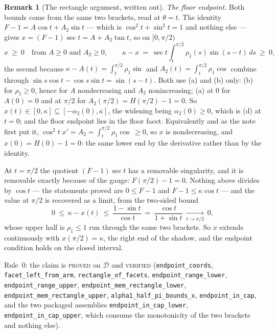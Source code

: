 \documentclass[11pt]{article}
\theoremstyle{definition}
\newtheorem{remark}[theorem]{Remark}
\begin{document}
\begin{remark}[The rectangle argument, written out]
\emph{The floor endpoint.} Both bounds come from the same two brackets, read at
$\theta=t$. The identity $F-1=A\cos t+A_2\sin t$ --- which is
$\cos^2t+\sin^2t=1$ and nothing else --- gives $x=(F-1)\sec t=A+A_2\tan t$, so on
$[0,\pi/2)$
\[
  x\ \ge\ 0\quad\text{from } A\ge0 \text{ and } A_2\ge0,\qquad
  \kappa-x\ =\ \sec t\int_t^{\pi/2}\!\rho_1(s)\sin(s-t)\,ds\ \ge\ 0 ,
\]
the second because $\kappa-A(t)=\int_t^{\pi/2}\rho_1\sin$ and $A_2(t)=\int_t^{\pi/2}\rho_1\cos$
combine through $\sin s\cos t-\cos s\sin t=\sin(s-t)$. Both use (a) and (b) only: (b) for
$\rho_1\ge0$, hence for $A$ nondecreasing and $A_2$ nonincreasing; (a) at $0$ for $A(0)=0$ and
at $\pi/2$ for $A_2(\pi/2)=H(\pi/2)-1=0$. So $x(t)\in[0,\kappa]\subseteq[-\alpha_2(0),\kappa]$,
the widening being $\alpha_2(0)\ge0$, which is (d) at $t=0$; and the floor endpoint lies in
the floor facet. Equivalently and as the note first put it,
$\cos^2t\;x'=A_2=\int_t^{\pi/2}\rho_1\cos\ \ge0$, so $x$ is nondecreasing, and
$x(0)=H(0)-1=0$: the same lower end by the derivative rather than by the identity.

At $t=\pi/2$ the quotient $(F-1)\sec t$ has a removable singularity, and it is removable
exactly because of the gauge: $F(\pi/2)-1=0$. Nothing above divides by $\cos t$ --- the
statements proved are $0\le F-1$ and $F-1\le\kappa\cos t$ --- and the value at $\pi/2$ is
recovered as a limit, from the two-sided bound
\[
  0\ \le\ \kappa-x(t)\ \le\ \frac{1-\sin t}{\cos t}\ =\ \frac{\cos t}{1+\sin t}
  \ \xrightarrow[t\to\pi/2]{}\ 0 ,
\]
whose upper half is $\rho_1\le1$ run through the same two brackets. So $x$ extends
continuously with $x(\pi/2)=\kappa$, the right end of the shadow, and the endpoint condition
holds on the closed interval.

Rule~0: the claim is \textsc{proved} on $\mathcal D$ and \textsc{verified}
(\verb|endpoint_coords|, \verb|facet_left_from_arm|, \verb|rectangle_of_facets|,
\verb|endpoint_range_lower|, \verb|endpoint_range_upper|,
\verb|endpoint_mem_rectangle_lower|, \verb|endpoint_mem_rectangle_upper|,
\verb|alpha1_half_pi_bounds_x|, \verb|endpoint_in_cap|, and the two packaged assemblies
\verb|endpoint_in_cap_lower|, \verb|endpoint_in_cap_upper|, which consume the monotonicity of
the two brackets and nothing else).


\end{remark}
\end{document}
